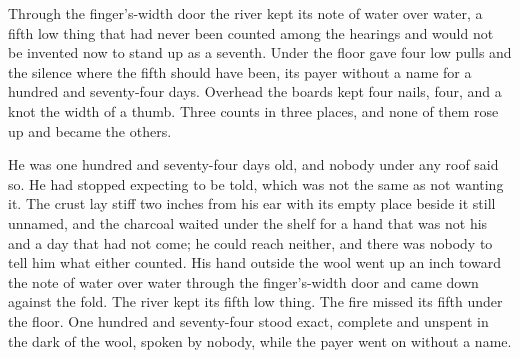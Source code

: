 Through the finger's-width door the river kept its note of water over water, a fifth low thing that had never been counted among the hearings and would not be invented now to stand up as a seventh. Under the floor  gave four low pulls and the silence where the fifth should have been, its payer without a name for a hundred and seventy-four days. Overhead the boards kept four nails, four, and a knot the width of a thumb. Three counts in three places, and none of them rose up and became the others.

He was one hundred and seventy-four days old, and nobody under any roof said so. He had stopped expecting to be told, which was not the same as not wanting it. The crust lay stiff two inches from his ear with its empty place beside it still unnamed, and the charcoal waited under the shelf for a hand that was not his and a day that had not come; he could reach neither, and there was nobody to tell him what either counted. His hand outside the wool went up an inch toward the note of water over water through the finger's-width door and came down against the fold. The river kept its fifth low thing. The fire missed its fifth under the floor. One hundred and seventy-four stood exact, complete and unspent in the dark of the wool, spoken by nobody, while the payer went on without a name.
